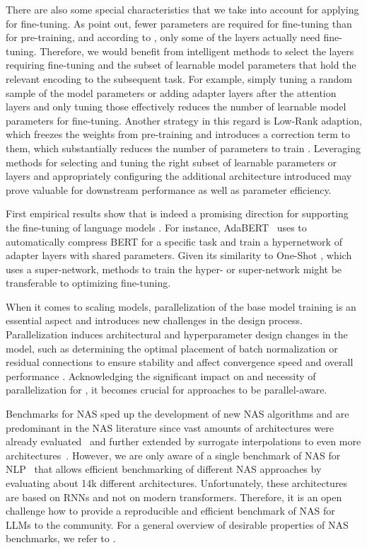 \documentclass[10pt]{article} %
\begin{document}
There are also some special characteristics that we take into account for applying \NAS for fine-tuning.
As \citet{aghajanyan-acl21} point out, fewer parameters are required for fine-tuning than for pre-training, and according to \citet{lee-arxiv19}, only some of the layers actually need fine-tuning.
Therefore, we would benefit from intelligent methods to select the layers requiring fine-tuning and the subset of learnable model parameters that hold the relevant encoding to the subsequent task. For example, simply tuning a random sample of the model parameters \citep{aghajanyan-acl21} or adding adapter layers after the attention layers and only tuning those \citep{houlsby-icml19} effectively reduces the number of learnable model parameters for fine-tuning. Another strategy in this regard is Low-Rank adaption, which freezes the weights from pre-training and introduces a correction term to them, which substantially reduces the number of parameters to train \citep{hu-iclr22a}.
Leveraging \AutoML methods for selecting and tuning the right subset of learnable parameters or layers and appropriately configuring the additional architecture introduced may prove valuable for downstream performance as well as parameter efficiency.

First empirical results show that \NAS is indeed a promising direction for supporting the fine-tuning of language models \citep{chitty-ieeea22a}.
For instance, AdaBERT~\citep{chen-ijcai20} uses \NAS to automatically compress BERT for a specific task and
\citet{mahabadi-acl21} train a hypernetwork of adapter layers with shared parameters. 
Given its similarity to One-Shot \NAS \citep{bender-icml18a,brock-iclr18a,shi-neurips20a}, which uses a super-network, methods to train the hyper- or super-network might be transferable to optimizing \LLM fine-tuning. 

When it comes to scaling models, parallelization of the base model training is an essential aspect and introduces new challenges in the design process.
Parallelization induces architectural and hyperparameter design changes in the model, such as determining the optimal placement of batch normalization or residual connections to ensure stability and affect convergence speed and overall performance \citep{shoeybi-arxiv2019a}. 
Acknowledging the significant impact on and necessity of parallelization for \LLMs, it becomes crucial for \NAS approaches to be parallel-aware.

Benchmarks for NAS sped up the development of new NAS algorithms and are predominant in the NAS literature since vast amounts of architectures were already evaluated~\citep{ying-icml19a,dong-iclr20a,mehta-iclr22a} and further extended by surrogate interpolations to even more architectures~\citep{zela-iclr22a}.
However, we are only aware of a single benchmark of NAS for NLP~\citep{klyuchnikov-tfas22a} that allows efficient benchmarking of different NAS approaches by evaluating about 14k different architectures. Unfortunately, these architectures are based on RNNs and not on modern transformers. Therefore, it is an open challenge how to provide a reproducible and efficient benchmark of NAS for LLMs to the community. For a general overview of desirable properties of NAS benchmarks, we refer to \citet{lindauer-jmlr20a}.
\end{document}
